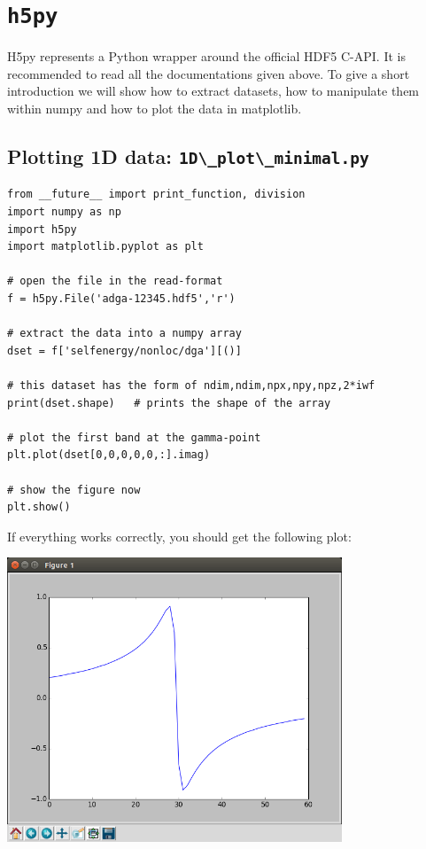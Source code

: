 \documentclass[a4paper,11pt]{article}
\numberwithin{equation}{section} %
\begin{document}
\section{\protect\Verb+h5py+}

H5py represents a Python wrapper around the official HDF5 C-API. It is recommended to read
all the documentations given above. To give a short introduction
we will show how to extract datasets, how to manipulate them within numpy and how
to plot the data in matplotlib. 
\newpage
\subsection*{Plotting 1D data: \protect\Verb+1D\_plot\_minimal.py+}
\begin{verbatim}
from __future__ import print_function, division
import numpy as np
import h5py
import matplotlib.pyplot as plt

# open the file in the read-format
f = h5py.File('adga-12345.hdf5','r')

# extract the data into a numpy array
dset = f['selfenergy/nonloc/dga'][()]

# this dataset has the form of ndim,ndim,npx,npy,npz,2*iwf
print(dset.shape)	# prints the shape of the array

# plot the first band at the gamma-point
plt.plot(dset[0,0,0,0,0,:].imag)

# show the figure now
plt.show()
\end{verbatim}

If everything works correctly, you should get the following plot:\\
\begin{center}
\includegraphics[width=0.75\textwidth]{1D_se.png}
\end{center}
\end{document}
